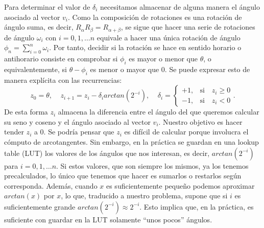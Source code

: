 \documentclass[12pt, a4paper]{article}
\begin{document}
 
 Para determinar el valor de $\delta_i$ necesitamos almacenar de alguna manera el ángulo asociado al vector $v_{i}$. Como la composición de rotaciones es una rotación de ángulo suma, es decir, $R_\alpha R_\beta=R_{\alpha+\beta}$, se sigue que hacer una serie de rotaciones de ángulo $\omega_i$ con $i = 0, 1,\ldots n$ equivale a hacer una única rotación de ángulo $\phi_n=\sum_{i=0}^n \omega_i$. Por tanto, decidir si la rotación se hace en sentido horario o antihorario consiste en comprobar si $\phi_i$ es mayor o menor que $\theta$, o equivalentemente, si $\theta-\phi_i$ es menor o mayor que 0. Se puede expresar esto de manera explícita con las recurrencias:
 \[
 z_0=\theta,\;\;\;\; z_{i+1}=z_{i}-\delta_iarctan(2^{-i}),\;\;\;\;
 \delta_i=\begin{cases}
+1,&\mathrm{ si }\quad z_{i}\geq 0\\
-1,&\mathrm{ si }\quad z_{i}<0
\end{cases}.
 \]
 De esta forma $z_i$ almacena la diferencia entre el ángulo del que queremos calcular su seno y coseno y el ángulo asociado al vector $v_i$. Nuestro objetivo es hacer tender $z_i$ a 0. Se podría pensar que $z_i$ es difícil de calcular porque involucra el cómputo de arcotangentes. Sin embargo, en la práctica se guardan en una lookup table (LUT) los valores de los ángulos que nos interesan, es decir, $arctan(2^{-i})$ para $i = 0, 1,\ldots n$. Si estos valores, que son siempre los mismos, ya los tenemos precalculados, lo único que tenemos que hacer es sumarlos o restarlos según corresponda. Además, cuando $x$ es suficientemente pequeño podemos aproximar $arctan(x)$ por $x$, lo que, traducido a nuestro problema, supone que si $i$ es suficientemente grande $arctan(2^{-i})\approx2^{-i}$. Esto implica que, en la práctica, es suficiente con guardar en la LUT solamente ``unos pocos'' ángulos.
 
\end{document}
